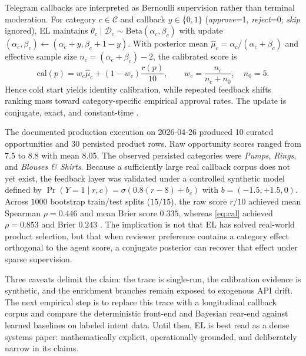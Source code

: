\documentclass[conference,a4paper,10pt]{IEEEtran}
\begin{document}
Telegram callbacks are interpreted as Bernoulli supervision rather than terminal moderation. For category $c\in\mathcal{C}$ and callback $y\in\{0,1\}$ (\emph{approve}=1, \emph{reject}=0; \emph{skip} ignored), EL maintains $\theta_c\mid\mathcal{D}_c\sim\mathrm{Beta}(\alpha_c,\beta_c)$ with update $(\alpha_c,\beta_c)\leftarrow(\alpha_c+y,\beta_c+1-y)$. With posterior mean $\hat{\mu}_c=\alpha_c/(\alpha_c+\beta_c)$ and effective sample size $n_c=(\alpha_c+\beta_c)-2$, the calibrated score is
\begin{equation}
\label{eq:cal}
\mathrm{cal}(p)=w_c\hat{\mu}_c+(1-w_c)\frac{r(p)}{10},
\qquad
w_c=\frac{n_c}{n_c+n_0},\quad n_0=5.
\end{equation}
Hence cold start yields identity calibration, while repeated feedback shifts ranking mass toward category-specific empirical approval rates. The update is conjugate, exact, and constant-time \cite{bishop2006prml}.

The documented production execution on \mbox{2026-04-26} produced 10 curated opportunities and 30 persisted product rows. Raw opportunity scores ranged from $7.5$ to $8.8$ with mean $8.05$. The observed persisted categories were \emph{Pumps}, \emph{Rings}, and \emph{Blouses \& Shirts}. Because a sufficiently large real callback corpus does not yet exist, the feedback layer was validated under a controlled synthetic model
defined by $\Pr(Y=1\mid r,c)=\sigma(0.8(r-8)+b_c)$ with $b=(-1.5,+1.5,0)$. Across $1000$ bootstrap train/test splits ($15/15$), the raw score $r/10$ achieved mean Spearman $\rho=0.446$ and mean Brier score $0.335$, whereas \cref{eq:cal} achieved $\rho=0.853$ and Brier $0.243$ \cite{guo2017calibration}. The implication is not that EL has solved real-world product selection, but that when reviewer preference contains a category effect orthogonal to the agent score, a conjugate posterior can recover that effect under sparse supervision.

Three caveats delimit the claim: the trace is single-run, the calibration evidence is synthetic, and the enrichment branches remain exposed to exogenous API drift. The next empirical step is to replace this trace with a longitudinal callback corpus and compare the deterministic front-end and Bayesian rear-end against learned baselines on labeled intent data. Until then, EL is best read as a dense systems paper: mathematically explicit, operationally grounded, and deliberately narrow in its claims.



\end{document}
